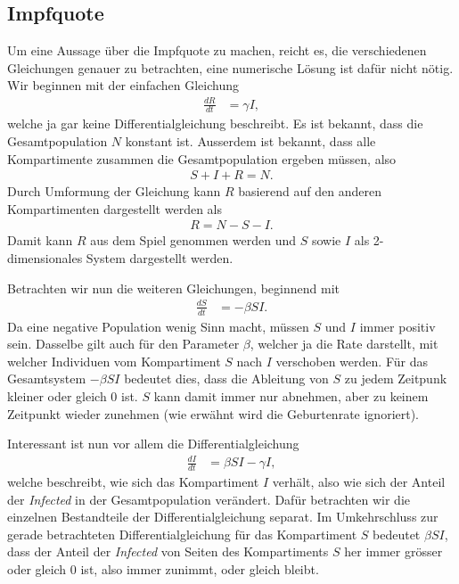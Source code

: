 \begin{refsection}
\section{Impfquote}
Um eine Aussage über die Impfquote zu machen, reicht es, die verschiedenen Gleichungen genauer zu betrachten, eine numerische Lösung ist dafür nicht nötig.
Wir beginnen mit der einfachen Gleichung
\begin{align*}
  \frac{dR}{dt} &= \gamma I,
\end{align*}
welche ja gar keine Differentialgleichung beschreibt. 
Es ist bekannt, dass die Gesamtpopulation $N$ konstant ist. 
Ausserdem ist bekannt, dass alle Kompartimente zusammen die Gesamtpopulation ergeben müssen, also
\begin{align*}
  S + I + R = N.
\end{align*}
Durch Umformung der Gleichung kann $R$ basierend auf den anderen Kompartimenten dargestellt werden als
\begin{align*}
  R = N - S - I.
\end{align*}
Damit kann $R$ aus dem Spiel genommen werden und $S$ sowie $I$ als 2-dimensionales System dargestellt werden.

Betrachten wir nun die weiteren Gleichungen, beginnend mit 
\begin{align*}
  \frac{dS}{dt} & = -\beta S I.
\end{align*}
Da eine negative Population wenig Sinn macht, müssen $S$ und $I$ immer positiv sein. 
Dasselbe gilt auch für den Parameter $\beta$, welcher ja die Rate darstellt, mit welcher Individuen vom Kompartiment $S$ nach $I$ verschoben werden.
Für das Gesamtsystem $-\beta S I$ bedeutet dies, dass die Ableitung von $S$ zu jedem Zeitpunk kleiner oder gleich 0 ist. $S$ kann damit immer nur abnehmen, aber zu keinem Zeitpunkt wieder zunehmen (wie erwähnt wird die Geburtenrate ignoriert).

Interessant ist nun vor allem die Differentialgleichung
\begin{align*}
  \frac{dI}{dt} & = \beta S I - \gamma I,
\end{align*}
welche beschreibt, wie sich das Kompartiment $I$ verhält, also wie sich der Anteil der \emph{Infected} in der Gesamtpopulation verändert.
Dafür betrachten wir die einzelnen Bestandteile der Differentialgleichung separat. 
Im Umkehrschluss zur gerade betrachteten Differentialgleichung für das Kompartiment $S$ bedeutet $\beta S I$, dass der Anteil der \emph{Infected} von Seiten des Kompartiments $S$ her immer grösser oder gleich 0 ist, also immer zunimmt, oder gleich bleibt.


\end{refsection}
